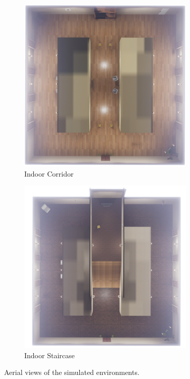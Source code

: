 \begin{figure}[H]
    \centering
    \begin{subfigure}[b]{0.48\textwidth}
        \centering
        \includegraphics[width=\textwidth]{resources/png/03/indoor-corridor/aerial.png}
        \caption{Indoor Corridor}
    \end{subfigure}
    \hfill
    \begin{subfigure}[b]{0.48\textwidth}
        \centering
        \includegraphics[width=\textwidth]{resources/png/03/indoor-staircase/aerial.png}
        \caption{Indoor Staircase}
    \end{subfigure}
    \caption{Aerial views of the simulated environments.}
    \label{fig:03.aerial.views}
\end{figure}

